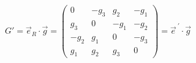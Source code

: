 \begin{equation}
G' =\vec{e}_{R} \cdot \vec{g}=\left(
\begin{array}{cccc}
0      & -g_{3} &  g_{2} &  -g_{1} \\
g_{3} &   0    &  -g_{1} & -g_{2} \\
-g_{2} & g_{1} &  0     &  -g_{3} \\
g_{1} &  g_{2} & g_{3} &  0 
\end{array}
\right) = \vec{e}^{~'} \cdot \vec{g}
\end{equation}

